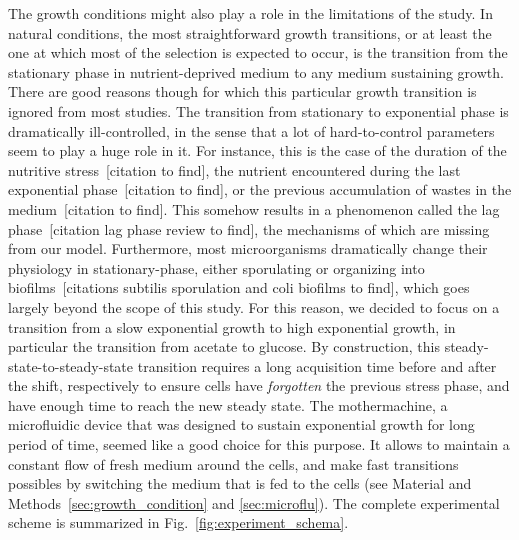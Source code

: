 The growth conditions might also play a role in the limitations of the study.
In natural conditions, the most straightforward growth transitions, or at least the one at which most of the selection is expected to occur, is the transition from the stationary phase in nutrient-deprived medium to any medium sustaining growth.
There are good reasons though for which this particular growth transition is ignored from most studies.
The transition from stationary to exponential phase is dramatically ill-controlled, in the sense that a lot of hard-to-control parameters seem to play a huge role in it.
For instance, this is the case of the duration of the nutritive stress~[citation to find], the nutrient encountered during the last exponential phase~[citation to find], or the previous accumulation of wastes in the medium~[citation to find].
This somehow results in a phenomenon called the lag phase~[citation lag phase review to find], the mechanisms of which are missing from our model.
Furthermore, most microorganisms dramatically change their physiology in stationary-phase, either sporulating or organizing into biofilms~[citations subtilis sporulation and coli biofilms to find], which goes largely beyond the scope of this study.
For this reason, we decided to focus on a transition from a slow exponential growth to high exponential growth, in particular the transition from acetate to glucose.
By construction, this steady-state-to-steady-state transition requires a long acquisition time before and after the shift, respectively to ensure cells have \textit{forgotten} the previous stress phase, and have enough time to reach the new steady state.
The mothermachine, a microfluidic device that was designed to sustain exponential growth for long period of time, seemed like a good choice for this purpose.
It allows to maintain a constant flow of fresh medium around the cells, and make fast transitions possibles by switching the medium that is fed to the cells (see Material and Methods~\ref{sec:growth_condition} and \ref{sec:microflu}).
The complete experimental scheme is summarized in Fig.~\ref{fig:experiment_schema}.

